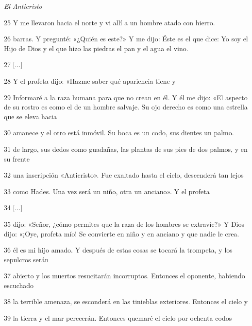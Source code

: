 \par \textit{El Anticristo}

\par 25 Y me llevaron hacia el norte y vi allí a un hombre atado con hierro.

\par 26 barras. Y pregunté: «¿Quién es este?» Y me dijo: Éste es el que dice: Yo soy el Hijo de Dios y el que hizo las piedras el pan y el agua el vino.

\par 27 [...]

\par 28 Y el profeta dijo: «Hazme saber qué apariencia tiene y

\par 29 Informaré a la raza humana para que no crean en él. Y él me dijo: «El aspecto de su rostro es como el de un hombre salvaje. Su ojo derecho es como una estrella que se eleva hacia

\par 30 amanece y el otro está inmóvil. Su boca es un codo, sus dientes un palmo.

\par 31 de largo, sus dedos como guadañas, las plantas de sus pies de dos palmos, y en su frente

\par 32 una inscripción «Anticristo». Fue exaltado hasta el cielo, descenderá tan lejos

\par 33 como Hades. Una vez será un niño, otra un anciano». Y el profeta

\par 34 [...]

\par 35 dijo: «Señor, ¿cómo permites que la raza de los hombres se extravíe?» Y Dios dijo: «¡Oye, profeta mío! Se convierte en niño y en anciano y que nadie le crea.

\par 36 él es mi hijo amado. Y después de estas cosas se tocará la trompeta, y los sepulcros serán

\par 37 abierto y los muertos resucitarán incorruptos. Entonces el oponente, habiendo escuchado

\par 38 la terrible amenaza, se esconderá en las tinieblas exteriores. Entonces el cielo y

\par 39 la tierra y el mar perecerán. Entonces quemaré el cielo por ochenta codos

